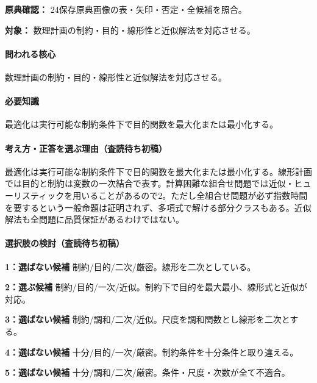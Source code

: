 \noindent\textbf{原典確認：} 24保存原典画像の表・矢印・否定・全候補を照合。\par

\noindent\textbf{対象：} 数理計画の制約・目的・線形性と近似解法を対応させる。\par

\paragraph{問われる核心} 数理計画の制約・目的・線形性と近似解法を対応させる。

\paragraph{必要知識} 最適化は実行可能な制約条件下で目的関数を最大化または最小化する。

\paragraph{考え方・正答を選ぶ理由（査読待ち初稿）} 最適化は実行可能な制約条件下で目的関数を最大化または最小化する。線形計画では目的と制約は変数の一次結合で表す。計算困難な組合せ問題では近似・ヒューリスティックを用いることがあるので2。ただし全組合せ問題が必ず指数時間を要するという一般命題は証明されず、多項式で解ける部分クラスもある。近似解法も全問題に品質保証があるわけではない。

\paragraph{選択肢の検討（査読待ち初稿）}\mbox{}\par

\noindent\textbf{1：選ばない候補} 制約/目的/二次/厳密。線形を二次としている。\par

\noindent\textbf{2：選ぶ候補} 制約/目的/一次/近似。制約下で目的を最大最小、線形式と近似が対応。\par

\noindent\textbf{3：選ばない候補} 制約/調和/二次/近似。尺度を調和関数とし線形を二次とする。\par

\noindent\textbf{4：選ばない候補} 十分/目的/一次/厳密。制約条件を十分条件と取り違える。\par

\noindent\textbf{5：選ばない候補} 十分/調和/二次/厳密。条件・尺度・次数が全て不適合。\par

